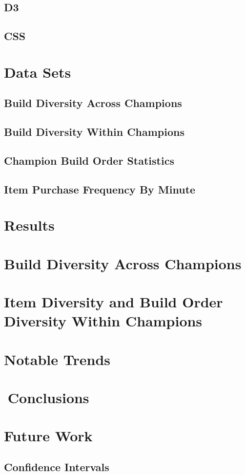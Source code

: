 \documentclass[11pt]{amsart}
\begin{document}
\subsection{D3}
\subsection{CSS}

\section{Data Sets}
\subsection{Build Diversity Across Champions}
\subsection{Build Diversity Within Champions}
\subsection{Champion Build Order Statistics}
\subsection{Item Purchase Frequency By Minute}


\section{Results}
\section{Build Diversity Across Champions}
\section{Item Diversity and Build Order Diversity Within Champions}
\section{Notable Trends}

\section{Conclusions}


\section{Future Work}
\subsection{Confidence Intervals}
\end{document}
